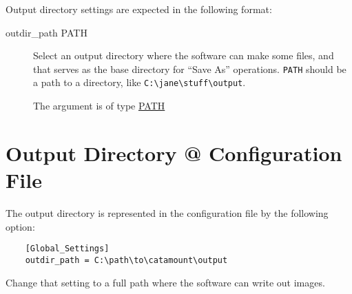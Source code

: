 Output directory settings are expected in the following format:

\begin{description}

\item[outdir\_path PATH]
\hypertarget{global-outdir-path}{}

Select an output directory where the software can make some files, and
that serves as the base directory for ``Save As'' operations.
\verb=PATH= should be a path to a directory, like \verb=C:\jane\stuff\output=.

The argument is of type \hyperlink{argument-type-path}{PATH}

\end{description}


\section{Output Directory @ Configuration File}

The output directory is represented in the configuration file by the
following option:

\begin{verbatim}
    [Global_Settings]
    outdir_path = C:\path\to\catamount\output
\end{verbatim}

Change that setting to a full path where the software can write out
images.
